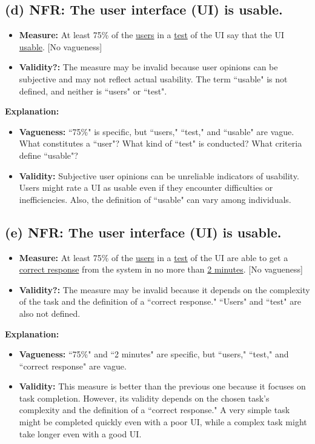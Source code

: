 \documentclass{article}
\begin{document}
\subsection*{(d) NFR: The user interface (UI) is usable.}

\begin{itemize}
    \item \textbf{Measure:} At least 75\% of the \underline{users} in a \underline{test} of the UI say that the UI \underline{usable}. [No vagueness]
    \item \textbf{Validity?:} The measure may be invalid because user opinions can be subjective and may not reflect actual usability. The term ``usable" is not defined, and neither is ``users" or ``test".
\end{itemize}

\textbf{Explanation:}

\begin{itemize}
    \item \textbf{Vagueness:} ``75\%" is specific, but ``users," ``test," and ``usable" are vague. What constitutes a ``user"? What kind of ``test" is conducted? What criteria define ``usable"?
    \item \textbf{Validity:} Subjective user opinions can be unreliable indicators of usability. Users might rate a UI as usable even if they encounter difficulties or inefficiencies. Also, the definition of ``usable" can vary among individuals.
\end{itemize}

\subsection*{(e) NFR: The user interface (UI) is usable.}

\begin{itemize}
    \item \textbf{Measure:} At least 75\% of the \underline{users} in a \underline{test} of the UI are able to get a \underline{correct response} from the system in no more than \underline{2 minutes}. [No vagueness]
    \item \textbf{Validity?:} The measure may be invalid because it depends on the complexity of the task and the definition of a ``correct response." ``Users" and ``test" are also not defined.
\end{itemize}

\textbf{Explanation:}

\begin{itemize}
    \item \textbf{Vagueness:} ``75\%" and ``2 minutes" are specific, but ``users," ``test," and ``correct response" are vague.
    \item \textbf{Validity:} This measure is better than the previous one because it focuses on task completion. However, its validity depends on the chosen task's complexity and the definition of a ``correct response." A very simple task might be completed quickly even with a poor UI, while a complex task might take longer even with a good UI.
\end{itemize}
\end{document}
